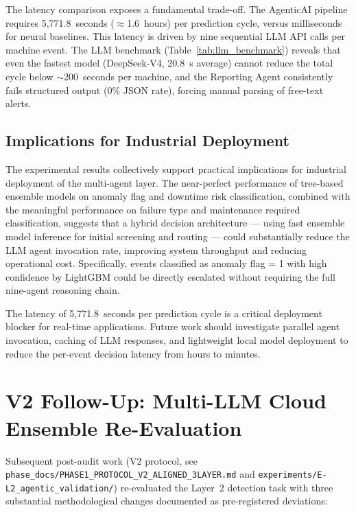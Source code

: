 The latency comparison exposes a fundamental trade-off. The AgenticAI pipeline requires 5,771.8~seconds ($\approx$1.6~hours) per prediction cycle, versus milliseconds for neural baselines. This latency is driven by nine sequential LLM API calls per machine event. The LLM benchmark (Table~\ref{tab:llm_benchmark}) reveals that even the fastest model (DeepSeek-V4, 20.8~s average) cannot reduce the total cycle below $\sim$200~seconds per machine, and the Reporting Agent consistently fails structured output (0\% JSON rate), forcing manual parsing of free-text alerts.

\subsection{Implications for Industrial Deployment}

The experimental results collectively support practical implications for industrial deployment of the multi-agent layer. The near-perfect performance of tree-based ensemble models on anomaly flag and downtime risk classification, combined with the meaningful performance on failure type and maintenance required classification, suggests that a hybrid decision architecture --- using fast ensemble model inference for initial screening and routing --- could substantially reduce the LLM agent invocation rate, improving system throughput and reducing operational cost. Specifically, events classified as anomaly flag = 1 with high confidence by LightGBM could be directly escalated without requiring the full nine-agent reasoning chain.

The latency of 5,771.8~seconds per prediction cycle is a critical deployment blocker for real-time applications. Future work should investigate parallel agent invocation, caching of LLM responses, and lightweight local model deployment to reduce the per-event decision latency from hours to minutes.


\section{V2 Follow-Up: Multi-LLM Cloud Ensemble Re-Evaluation}
\label{sec:el2_v3_followup}

Subsequent post-audit work (V2 protocol, see \texttt{phase\_docs/PHASE1\_PROTOCOL\_V2\_ALIGNED\_3LAYER.md} and \texttt{experiments/E-L2\_agentic\_validation/}) re-evaluated the Layer~2 detection task with three substantial methodological changes documented as pre-registered deviations:

